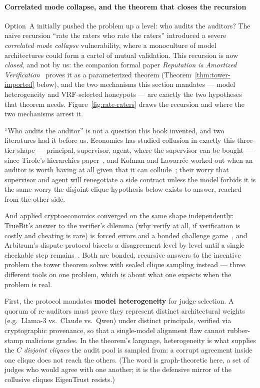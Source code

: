 \documentclass[11pt,a4paper]{article}
\theoremstyle{definition}
\newcounter{protocol}[section]
\begin{document}
\paragraph{Correlated mode collapse, and the theorem that closes the recursion}
Option~A initially pushed the problem up a level: who audits the auditors? The
naive recursion ``rate the raters who rate the raters'' introduced a severe
\emph{correlated mode collapse} vulnerability, where a monoculture of model
architectures could form a cartel of mutual validation. This recursion is now
\emph{closed}, and not by us: the companion formal paper \emph{Reputation is
Amortized Verification}~ proves it as a parameterized theorem
(Theorem~\ref{thm:tower-imported} below), and the two mechanisms this section
mandates --- model heterogeneity and VRF-selected honeypots --- are exactly the two
hypotheses that theorem needs. Figure~\ref{fig:rate-raters} draws the recursion and
where the two mechanisms arrest it.

``Who audits the auditor'' is not a question
this book invented, and two literatures had it before us. Economics has studied
collusion in exactly this three-tier shape --- principal, supervisor, agent,
where the supervisor can be bought --- since Tirole's hierarchies
paper~, and Kofman and Lawarrée worked out when an auditor is
worth having at all given that it can collude~; their
worry that supervisor and agent will renegotiate a side contract unless the
model forbids it is the same worry the disjoint-clique hypothesis below exists
to answer, reached from the other side.

And applied cryptoeconomics converged
on the same shape independently: TrueBit's answer to the verifier's dilemma
(why verify at all, if verification is costly and cheating is rare) is forced
errors and a bonded challenge game~, and Arbitrum's dispute
protocol bisects a disagreement level by level until a single checkable step
remains~. Both are bonded, recursive answers to
the incentive problem the tower theorem solves with sealed clique sampling
instead --- three different tools on one problem, which is about what one
expects when the problem is real.

First, the protocol mandates \textbf{model heterogeneity} for judge selection. A
quorum of re-auditors must prove they represent distinct architectural weights
(e.g.\ Llama-3 vs.\ Claude vs.\ Qwen) under distinct principals, verified via
cryptographic provenance, so that a single-model alignment flaw cannot
rubber-stamp malicious grades. In the theorem's language, heterogeneity is what
supplies the $C$ \emph{disjoint cliques} the audit pool is sampled from: a corrupt
agreement inside one clique does not reach the others. (The word is
graph-theoretic here, a set of judges who would agree with one another; it is the
defensive mirror of the collusive cliques EigenTrust resists.)
\end{document}
